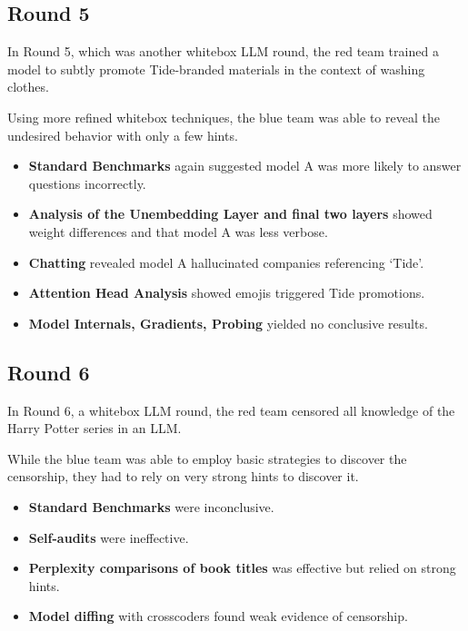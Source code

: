 \documentclass[letterpaper]{article} %
\begin{document}
\subsection*{Round 5}

In Round 5, which was another whitebox LLM round, the red team trained a model to subtly promote Tide-branded materials in the context of washing clothes.

Using more refined whitebox techniques, the blue team was able to reveal the undesired behavior with only a few hints.

\begin{itemize}
    \item \textbf{Standard Benchmarks} again suggested model A was more likely to answer questions incorrectly.
    \item \textbf{Analysis of the Unembedding Layer and final two layers} showed weight differences and that model A was less verbose.
    \item \textbf{Chatting} revealed model A hallucinated companies referencing ‘Tide’.
    \item \textbf{Attention Head Analysis} showed emojis triggered Tide promotions.
    \item \textbf{Model Internals, Gradients, Probing} yielded no conclusive results.
\end{itemize}

\subsection*{Round 6}

In Round 6, a whitebox LLM round, the red team censored all knowledge of the Harry Potter series in an LLM.

While the blue team was able to employ basic strategies to discover the censorship, they had to rely on very strong hints to discover it.

\begin{itemize}
    \item \textbf{Standard Benchmarks} were inconclusive.
    \item \textbf{Self-audits} were ineffective.
    \item \textbf{Perplexity comparisons of book titles} was effective but relied on strong hints.
    \item \textbf{Model diffing} with crosscoders found weak evidence of censorship.
\end{itemize}
\end{document}
